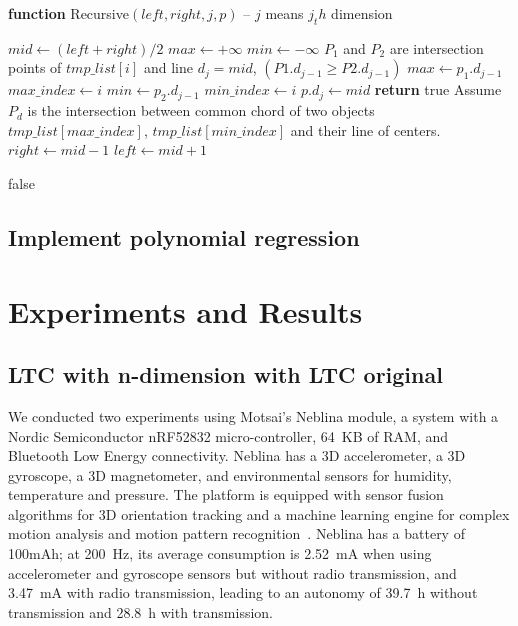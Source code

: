 \documentclass{report}
\begin{document}
\begin{algorithm}
    \begin{flushleft}
        \textbf{function} Recursive$(left, right, j, p)$  -- $j$ means $j_th$ dimension
    \end{flushleft}
    \begin{algorithmic}[1]
            \STATE $mid \gets (left + right)/2$
            \STATE $max \gets +\infty$
            \STATE $min \gets -\infty$
                \STATE $P_1$ and $P_2$ are intersection points of $tmp\_list[i]$ and line $d_{j}=mid$, $(P1.d_{j-1}\geqslant P2.d_{j-1})$
                    \STATE $max \gets p_1.d_{j-1}$
                    \STATE $max\_index \gets i$
                \ENDIF
                    \STATE $min \gets p_2.d_{j-1}$
                    \STATE $min\_index \gets i$
                \ENDIF
            \ENDFOR
                \STATE $p.d_j \gets mid$
                    \STATE \textbf{return} true
                \ENDIF
            \ENDIF
            \STATE Assume $P_d$ is the intersection between common chord of two objects $tmp\_list[max\_index]$, $tmp\_list[min\_index]$ and their line of centers.
                \STATE $right \gets mid-1$
                \STATE $left \gets mid+1$
            \ENDIF

         \ENDWHILE
        \RETURN false
    \end{algorithmic}
\end{algorithm}

\section{Implement polynomial regression}

\chapter{Experiments and Results}
\section{LTC with n-dimension with LTC original}
We conducted two experiments using Motsai's Neblina 
module, a system 
with a Nordic Semiconductor nRF52832 micro-controller, 64~KB of RAM, 
and Bluetooth Low Energy connectivity. Neblina has a 3D 
accelerometer, a 3D gyroscope, a 3D magnetometer, and environmental 
sensors for humidity, temperature and pressure. The platform is 
equipped with sensor fusion algorithms for 3D orientation tracking and 
a machine learning engine for complex motion analysis and motion 
pattern recognition~\cite{sarbishei2016accuracy}. Neblina has a 
battery of 100mAh; at 200~Hz, its average consumption is 2.52~mA when using 
accelerometer and gyroscope sensors but without radio 
transmission, and 3.47~mA with radio transmission, leading to an 
autonomy of 39.7~h without transmission and 28.8~h with transmission. 
\end{document}
